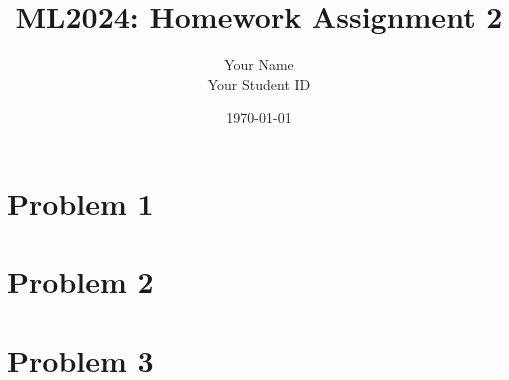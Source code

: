 \documentclass[12pt, a4paper,oneside, UTF8]{article}
\title{ML2024: Homework Assignment 2}
\author{
Your Name\\
Your Student ID
}
\date{\today}
\renewenvironment{proof}{\textbf{Proof:}\\}{\qed\par}
\newenvironment{solution}{\textbf{Solution:}\\}{\qed\par}
\begin{document}
\maketitle

\section{Problem 1}
    



\section{Problem 2}
    



\section{Problem 3}
\end{document}
